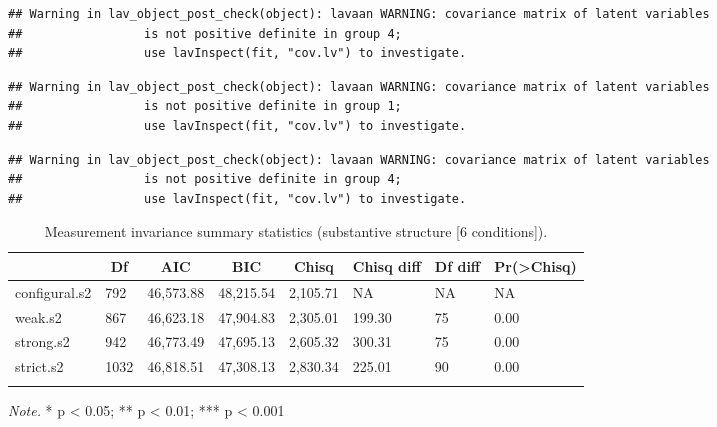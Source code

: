 \documentclass[
  english,
  man]{apa6}
\begin{document}
\begin{verbatim}
## Warning in lav_object_post_check(object): lavaan WARNING: covariance matrix of latent variables
##                 is not positive definite in group 4;
##                 use lavInspect(fit, "cov.lv") to investigate.
\end{verbatim}

\begin{verbatim}
## Warning in lav_object_post_check(object): lavaan WARNING: covariance matrix of latent variables
##                 is not positive definite in group 1;
##                 use lavInspect(fit, "cov.lv") to investigate.
\end{verbatim}

\begin{verbatim}
## Warning in lav_object_post_check(object): lavaan WARNING: covariance matrix of latent variables
##                 is not positive definite in group 4;
##                 use lavInspect(fit, "cov.lv") to investigate.
\end{verbatim}

\begin{table}[tbp]

\begin{center}
\begin{threeparttable}

\caption{\label{tab:measinv.siop2.sub}Measurement invariance summary statistics (substantive structure [6 conditions]).}

\begin{tabular}{llllllll}
\toprule
 & \multicolumn{1}{c}{Df} & \multicolumn{1}{c}{AIC} & \multicolumn{1}{c}{BIC} & \multicolumn{1}{c}{Chisq} & \multicolumn{1}{c}{Chisq diff} & \multicolumn{1}{c}{Df diff} & \multicolumn{1}{c}{Pr(>Chisq)}\\
\midrule
configural.s2 & 792 & 46,573.88 & 48,215.54 & 2,105.71 & NA & NA & NA\\
weak.s2 & 867 & 46,623.18 & 47,904.83 & 2,305.01 & 199.30 & 75 & 0.00\\
strong.s2 & 942 & 46,773.49 & 47,695.13 & 2,605.32 & 300.31 & 75 & 0.00\\
strict.s2 & 1032 & 46,818.51 & 47,308.13 & 2,830.34 & 225.01 & 90 & 0.00\\
\bottomrule
\addlinespace
\end{tabular}

\begin{tablenotes}[para]
\normalsize{\textit{Note.} * p < 0.05; ** p < 0.01; *** p < 0.001}
\end{tablenotes}

\end{threeparttable}
\end{center}

\end{table}
\end{document}
